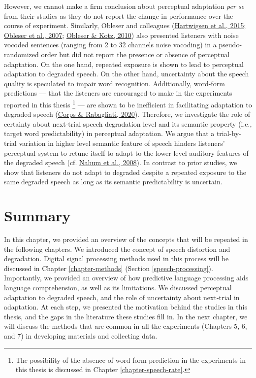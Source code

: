 \documentclass[a4paper, nobind]{templates/ociamthesis}
\begin{document}
However, we cannot make a firm conclusion about perceptual adaptation \emph{per se} from their studies as they do not report the change in performance over the course of experiment.
Similarly, Obleser and colleagues (\protect\hyperlink{ref-Hartwigsen2015}{Hartwigsen et al., 2015}; \protect\hyperlink{ref-Obleser2007}{Obleser et al., 2007}; \protect\hyperlink{ref-Obleser2010}{Obleser \& Kotz, 2010}) also presented listeners with noise vocoded sentences (ranging from 2 to 32 channels noise vocoding) in a pseudo-randomized order but did not report the presence or absence of perceptual adaptation.
On the one hand, repeated exposure is shown to lead to perceptual adaptation to degraded speech.
On the other hand, uncertainty about the speech quality is speculated to impair word recognition.
Additionally, word-form predictions --- that the listeners are encouraged to make in the experiments reported in this thesis \footnote{The possibility of the absence of word-form prediction in the experiments in this thesis is discussed in Chapter \ref{chapter-speech-rate}.} --- are shown to be inefficient in facilitating adaptation to degraded speech (\protect\hyperlink{ref-Corps2020}{Corps \& Rabagliati, 2020}).
Therefore, we investigate the role of certainty about next-trial speech degradation level and its semantic property (i.e., target word predictability) in perceptual adaptation.
We argue that a trial-by-trial variation in higher level semantic feature of speech hinders listeners' perceptual system to retune itself to adapt to the lower level auditory features of the degraded speech (cf. \protect\hyperlink{ref-Nahum2008}{Nahum et al., 2008}).
In contrast to prior studies, we show that listeners do not adapt to degraded despite a repeated exposure to the same degraded speech
as long as its semantic predictability is uncertain.

\hypertarget{summary}{%
\section{Summary}\label{summary}}

In this chapter, we provided an overview of the concepts that will be repeated in the following chapters.
We introduced the concept of speech distortion and degradation.
Digital signal processing methods used in this process will be discussed in Chapter \ref{chapter-methods} (Section \ref{speech-processing}).
Importantly, we provided an overview of how predictive language processing aids language comprehension,
as well as its limitations.
We discussed perceptual adaptation to degraded speech, and the role of uncertainty about next-trial in adaptation.
At each step, we presented the motivation behind the studies in this thesis,
and the gaps in the literature these studies fill in.
In the next chapter, we will discuss the methods that are common in all the experiments (Chapters 5, 6, and 7) in developing materials and collecting data.
\end{document}
